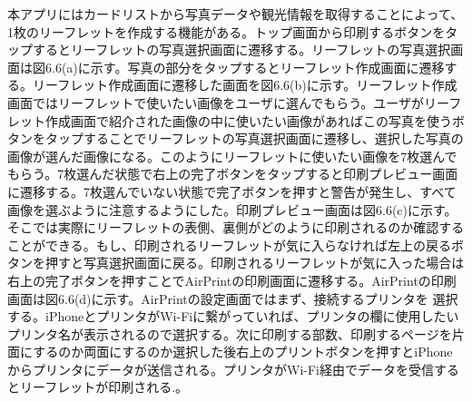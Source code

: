 本アプリにはカードリストから写真データや観光情報を取得することによって、1枚のリーフレットを作成する機能がある。トップ画面から印刷するボタンをタップするとリーフレットの写真選択画面に遷移する。リーフレットの写真選択画面は図6.6(a)に示す。写真の部分をタップするとリーフレット作成画面に遷移する。リーフレット作成画面に遷移した画面を図6.6(b)に示す。リーフレット作成画面ではリーフレットで使いたい画像をユーザに選んでもらう。ユーザがリーフレット作成画面で紹介された画像の中に使いたい画像があればこの写真を使うボタンをタップすることでリーフレットの写真選択画面に遷移し、選択した写真の画像が選んだ画像になる。このようにリーフレットに使いたい画像を7枚選んでもらう。7枚選んだ状態で右上の完了ボタンをタップすると印刷プレビュー画面に遷移する。7枚選んでいない状態で完了ボタンを押すと警告が発生し、すべて画像を選ぶように注意するようにした。印刷プレビュー画面は図6.6(c)に示す。そこでは実際にリーフレットの表側、裏側がどのように印刷されるのか確認することができる。もし、印刷されるリーフレットが気に入らなければ左上の戻るボタンを押すと写真選択画面に戻る。印刷されるリーフレットが気に入った場合は右上の完了ボタンを押すことでAirPrintの印刷画面に遷移する。AirPrintの印刷画面は図6.6(d)に示す。AirPrintの設定画面ではまず、接続するプリンタを 選択する。iPhoneとプリンタがWi-Fiに繋がっていれば、プリンタの欄に使用したいプリンタ名が表示されるので選択する。次に印刷する部数、印刷するページを片面にするのか両面にするのか選択した後右上のプリントボタンを押すとiPhoneからプリンタにデータが送信される。プリンタがWi-Fi経由でデータを受信するとリーフレットが印刷される.。
